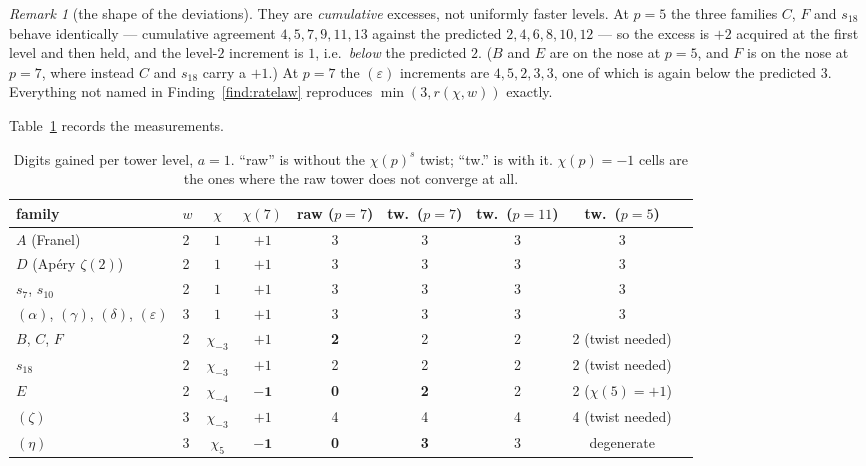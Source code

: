 \documentclass[11pt,reqno]{article}
\theoremstyle{plain}
\theoremstyle{definition}
\theoremstyle{remark}
\newtheorem{remark}[theorem]{Remark}
\numberwithin{equation}{section}
\begin{document}
\begin{remark}[the shape of the deviations]
They are \emph{cumulative} excesses, not uniformly faster levels.  At $p=5$ the three families
$C$, $F$ and $s_{18}$ behave identically --- cumulative agreement $4,5,7,9,11,13$ against the
predicted $2,4,6,8,10,12$ --- so the excess is $+2$ acquired at the first level and then held,
and the level-$2$ increment is $1$, i.e.\ \emph{below} the predicted $2$.  ($B$ and $E$ are on
the nose at $p=5$, and $F$ is on the nose at $p=7$, where instead $C$ and $s_{18}$ carry a $+1$.)
At $p=7$ the $(\varepsilon)$ increments are $4,5,2,3,3$, one of which is again below the
predicted $3$.  Everything not named in Finding~\ref{find:ratelaw} reproduces
$\min(3,r(\chi,w))$ exactly.
\end{remark}

Table~\ref{tab:familyrates} records the measurements.

\begin{table}[h]
\centering\small
\caption{Digits gained per tower level, $a=1$.  ``raw'' is without the
$\chi(p)^{s}$ twist; ``tw.'' is with it.  $\chi(p)=-1$ cells are the ones where
the raw tower does not converge at all.}
\label{tab:familyrates}
\begin{tabular}{@{}llccccccc@{}}
\toprule
family & $w$ & $\chi$ & $\chi(7)$ & raw ($p=7$) & tw.\ ($p=7$) & tw.\ ($p=11$) & tw.\ ($p=5$)\\
\midrule
$A$ (Franel) & 2 & $1$ & $+1$ & 3 & 3 & 3 & 3\\
$D$ (Ap\'ery $\zeta(2)$) & 2 & $1$ & $+1$ & 3 & 3 & 3 & 3\\
$s_7$, $s_{10}$ & 2 & $1$ & $+1$ & 3 & 3 & 3 & 3\\
$(\alpha)$, $(\gamma)$, $(\delta)$, $(\varepsilon)$ & 3 & $1$ & $+1$ & 3 & 3 & 3 & 3\\
$B$, $C$, $F$ & 2 & $\chi_{-3}$ & $+1$ & \textbf{2} & 2 & 2 & 2 (twist needed)\\
$s_{18}$ & 2 & $\chi_{-3}$ & $+1$ & 2 & 2 & 2 & 2 (twist needed)\\
$E$ & 2 & $\chi_{-4}$ & $\mathbf{-1}$ & \textbf{0} & \textbf{2} & 2 & 2 ($\chi(5)=+1$)\\
$(\zeta)$ & 3 & $\chi_{-3}$ & $+1$ & 4 & 4 & 4 & 4 (twist needed)\\
$(\eta)$ & 3 & $\chi_{5}$ & $\mathbf{-1}$ & \textbf{0} & \textbf{3} & 3 & degenerate\\
\bottomrule
\end{tabular}
\end{table}
\end{document}
